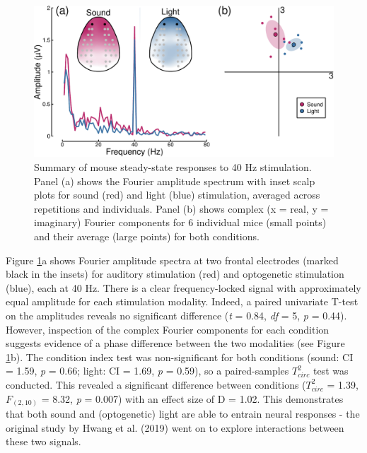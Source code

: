 \documentclass[]{article}
\begin{document}
\begin{figure}

{\centering \includegraphics{manuscript_files/figure-latex/mousedata-1} 

}

\caption{Summary of mouse steady-state responses to 40 Hz stimulation. Panel (a) shows the Fourier amplitude spectrum with inset scalp plots for sound (red) and light (blue) stimulation, averaged across repetitions and individuals. Panel (b) shows complex (x = real, y = imaginary) Fourier components for 6 individual mice (small points) and their average (large points) for both conditions.}\label{fig:mousedata}
\end{figure}

Figure \ref{fig:mousedata}a shows Fourier amplitude spectra at two frontal electrodes (marked black in the insets) for auditory stimulation (red) and optogenetic stimulation (blue), each at 40 Hz. There is a clear frequency-locked signal with approximately equal amplitude for each stimulation modality. Indeed, a paired univariate T-test on the amplitudes reveals no significant difference (\emph{t} = 0.84, \emph{df} = 5, \emph{p} = 0.44). However, inspection of the complex Fourier components for each condition suggests evidence of a phase difference between the two modalities (see Figure \ref{fig:mousedata}b). The condition index test was non-significant for both conditions (sound: CI = 1.59, \emph{p} = 0.66; light: CI = 1.69, \emph{p} = 0.59), so a paired-samples \(T^2_{circ}\) test was conducted. This revealed a significant difference between conditions (\(T^2_{circ}\) = 1.39, \(F_{(2,10)}\) = 8.32, \emph{p} = 0.007) with an effect size of D = 1.02. This demonstrates that both sound and (optogenetic) light are able to entrain neural responses - the original study by Hwang et al. (2019) went on to explore interactions between these two signals.
\end{document}
